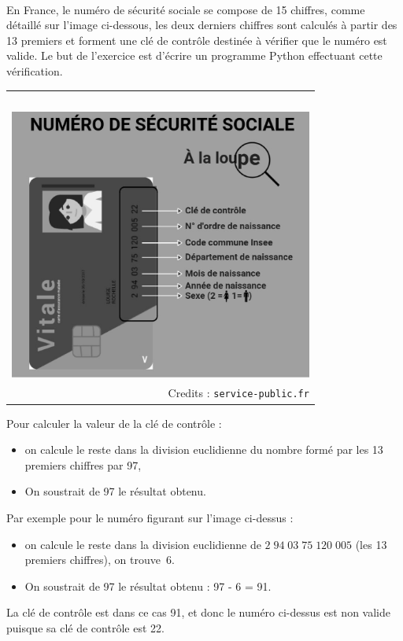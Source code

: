 \documentclass[11pt,a4paper]{article}
\begin{document}
\begin{Exercise}[title = {gestion de tests dans une entreprise},origin={\bac \; d'après {\sc ccinp 2023 - tpc, tsi}}] \\
\ExePart[name = Tests de code de sécurité sociale]
En France, le numéro de sécurité sociale se compose de 15 chiffres, comme détaillé sur l'image ci-dessous, les deux derniers chiffres sont calculés à partir des 13 premiers et forment une clé de contrôle destinée à vérifier que le numéro est valide. Le but de l'exercice est d'écrire un programme Python effectuant cette vérification.
\begin{center}
	\renewcommand{\arraystretch}{0.3}
	\begin{tabular}{r}
		\ \\
	\includegraphics[width=10cm]{nss.eps} \\
	Credits : {\tt service-public.fr}\\
	\end{tabular}
\end{center}
Pour calculer la valeur de la clé de contrôle :
\begin{itemize}
	\item on calcule le reste dans la division euclidienne du nombre formé par les 13 premiers chiffres par 97,
	\item On soustrait de 97 le résultat obtenu.
\end{itemize}
Par exemple pour le numéro figurant sur l'image ci-dessus :
\begin{itemize}
	\item on calcule le reste dans la division euclidienne de $2\;94\;03\;75\;120\;005$ (les 13 premiers chiffres), on trouve~6.
	\item On soustrait de 97 le résultat obtenu : 97 - 6 = 91.
\end{itemize}
La clé de contrôle est dans ce cas 91, et donc le numéro ci-dessus est non valide puisque sa clé de contrôle est 22.


\end{Exercise}
\end{document}
